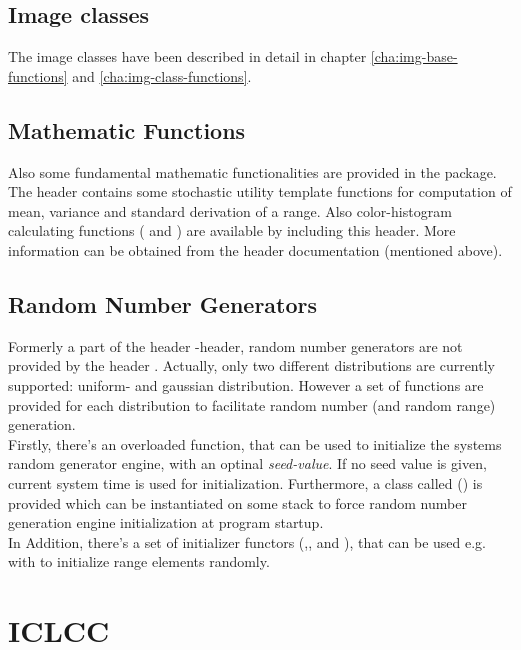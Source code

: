\subsection{Image classes}
The image classes have been described in detail in chapter \ref{cha:img-base-functions} and \ref{cha:img-class-functions}.


\subsection{Mathematic Functions}
Also some fundamental mathematic functionalities are provided in the package. The header  contains some stochastic utility template functions for computation of mean, variance and standard derivation of a range. Also color-histogram calculating functions ( and ) are available by including this header. More information can be obtained from the header documentation (mentioned above).

\subsection{Random Number Generators}
Formerly a part of the header -header, random number generators are not provided by the header . Actually, only two different distributions are currently supported: uniform- and gaussian distribution. However a set of functions are provided for each distribution to facilitate random number (and random range) generation. \\
Firstly, there's an overloaded  function, that can be used to initialize the systems random generator engine, with an optinal \emph{seed-value}. If no seed value is given, current system time is used for initialization. Furthermore, a class called  () is provided which can be instantiated on some stack to force random number generation engine initialization at program startup. \\
In Addition, there's a set of initializer functors (,, and ), that can be used e.g. with  to initialize range elements randomly. 



\section{ICLCC\label{sec:cc}}

